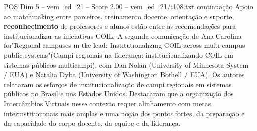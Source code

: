 \begin{textsample}{POS Dim 5 – vem\_ed\_21 – Score 2.00 – vem\_ed\_21/t108.txt}  \label{ex:f5_pos_088}
continuação Apoio ao matchmaking entre parceiros, treinamento docente, orientação e suporte, \textbf{reconhecimento} de professores e alunos estão entre as recomendações para institucionalizar as iniciativas COIL.
A segunda comunicação de Ana Carolina foi"Regional campuses in the lead: Institutionalizing COIL across multi-campus public systems"(Campi regionais na liderança: institucionalizando COIL em sistemas públicos multicampi), com Dan Nolan (University of Minnesota System / EUA) e Natalia Dyba (University of Washington Bothell / EUA).
Os autores relataram os esforços de institucionalização de campi regionais em sistemas públicos no Brasil e nos Estados Unidos.
Destacaram que a organização dos Intercâmbios Virtuais nesse contexto requer alinhamento com metas interinstitucionais mais amplas e uma noção dos pontos fortes, da preparação e da capacidade do corpo docente, da equipe e da liderança.

\end{textsample}
